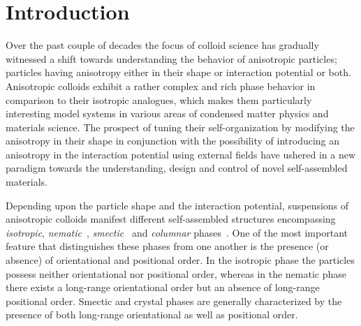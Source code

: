 \documentclass[aps,prl,preprint,superscriptaddress]{revtex4-1} %
\begin{document}
\section{Introduction}
Over the past couple of decades the focus of colloid science has gradually witnessed a shift towards understanding the behavior of anisotropic particles; particles having anisotropy either in their shape or interaction potential or both. Anisotropic colloids exhibit a rather complex and rich phase behavior in comparison to their isotropic analogues, which makes them particularly interesting model systems in various areas of condensed matter physics and materials science. The prospect of tuning their self-organization by modifying the anisotropy in their shape in conjunction with the possibility of introducing an anisotropy in the interaction potential using external fields have ushered in a new paradigm towards the understanding, design and control of novel self-assembled materials. \par
Depending upon the particle shape and the interaction potential, suspensions of aniso\-tropic colloids manifest different
self-assembled structures encompassing \emph{isotropic}, 
\emph{nematic}~\cite{pizzey2004suspensions, van1998formation, purdy2005nematic, buining1993isotropic, fraden1989isotropic, lemaire2002outstanding, lemaire2004physical, vroege2014biaxial, van2010uniaxial, rossi2010cholesteric, li2016colloidal,dogic2016filamentous}, 
\emph{smectic}~\cite{davidson2018isotropic, vroege2006smectic, kuijk2012phase} and \emph{columnar} phases~\cite{van2000liquid, brown1999phase, wijnhoven2005sedimentation, van2004liquid, van2005evidence}. 
One of the most important feature that distinguishes these phases from one another is the presence (or absence) of orientational and positional order. In the isotropic phase the particles possess neither 
orientational nor positional order, whereas in the nematic phase there exists a long-range orientational order but an absence of long-range positional order. 
Smectic and crystal phases are generally characterized by the presence of both long-range orientational as well as positional order. \par
\end{document}
